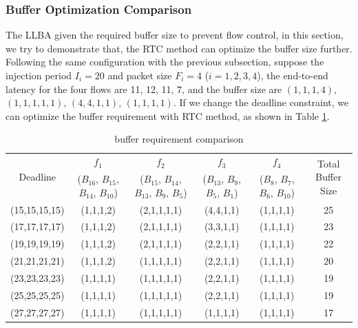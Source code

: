 \documentclass[10pt,journal]{IEEEtran}
\begin{document}
\subsubsection{Buffer Optimization Comparison}
The LLBA \cite{189} given the required buffer size to prevent flow control, in this section, we try to demonstrate that, the RTC method can optimize the buffer size further. Following the same configuration with the previous subsection, suppose the injection period $I_i=20$ and packet size $F_i=4$ ($i=1,2,3,4$), the end-to-end latency for the four flows are 11, 12, 11, 7, and the buffer size are $(1,1,1,4)$, $(1,1,1,1,1)$, $(4,4,1,1)$, $(1,1,1,1)$. If we change the deadline constraint, we can optimize the buffer requirement with RTC method, as shown in Table \ref{LLBAvsRTC}.
\begin{table}[htbp]
\centering
\caption{\label{LLBAvsRTC}buffer requirement comparison}
\begin{tabular}{|c|c|c|c|c|c|}
\hline
\multirow{2}{*}{Deadline}  & $f_1$  &   $f_2$   &   $f_3$   &   $f_4$   &   \multirow{2}{*}{Total Buffer Size} \\
($D_1$, $D_2$, $D_3$, $D_4$)    &   ($B_{16}$, $B_{15}$, $B_{14}$, $B_{10}$)  &   ($B_{15}$, $B_{14}$, $B_{13}$, $B_{9}$, $B_5$)  & ($B_{13}$, $B_{9}$, $B_{5}$, $B_{1}$)   &    ($B_{8}$, $B_{7}$, $B_{6}$, $B_{10}$)   &   \\
\hline
(15,15,15,15)   &   (1,1,1,2)   &   (2,1,1,1,1) &   (4,4,1,1)   &   (1,1,1,1)   &   25\\
\hline
(17,17,17,17)   &   (1,1,1,2)   &   (2,1,1,1,1) &   (3,3,1,1)   &   (1,1,1,1)   &   23\\
\hline
(19,19,19,19)   &   (1,1,1,2)   &   (2,1,1,1,1) &   (2,2,1,1)   &   (1,1,1,1)   &   22\\
\hline
(21,21,21,21)   &   (1,1,1,2)   &   (1,1,1,1,1) &   (2,2,1,1)   &   (1,1,1,1)   &   20\\
\hline
(23,23,23,23)   &   (1,1,1,1)   &   (1,1,1,1,1) &   (2,2,1,1)   &   (1,1,1,1)   &   19\\
\hline
(25,25,25,25)   &   (1,1,1,1)   &   (1,1,1,1,1) &   (2,2,1,1)   &   (1,1,1,1)   &   19\\
\hline
(27,27,27,27)   &   (1,1,1,1)   &   (1,1,1,1,1) &   (1,1,1,1)   &   (1,1,1,1)   &   17\\
\hline
\end{tabular}
\end{table}
\end{document}
